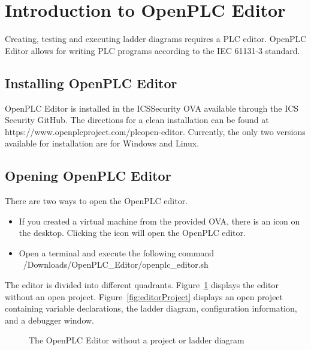 \section{Introduction to OpenPLC Editor} 

Creating, testing and executing ladder diagrams requires a PLC editor. OpenPLC Editor allows for writing PLC programs according to the IEC 61131-3 standard.

\subsection{Installing OpenPLC Editor}
OpenPLC Editor is installed in the ICSSecurity OVA available through the ICS Security GitHub. The directions for a clean installation can be found at https://www.openplcproject.com/plcopen-editor. Currently, the only two versions available for installation are for Windows and Linux.

\subsection{Opening OpenPLC Editor}
There are two ways to open the OpenPLC editor. 
\begin{itemize}[noitemsep]
    \item If you created a virtual machine from the provided OVA, there is an icon on the desktop. Clicking the icon will open the OpenPLC editor.
    \item Open a terminal and execute the following command ~/Downloads/OpenPLC\_Editor/openplc\_editor.sh 
\end{itemize}

The editor is divided into different quadrants. Figure~\ref{fig:editorEmpty} displays the editor without an open project. Figure~\ref{fig:editorProject} displays an open project containing variable declarations, the ladder diagram, configuration information, and a debugger window.

\clearpage
\begin{figure}[!htb]
\begin{center}
\end{center}
\caption{The OpenPLC Editor without a project or ladder diagram}
\label{fig:editorEmpty}
\end{figure}

